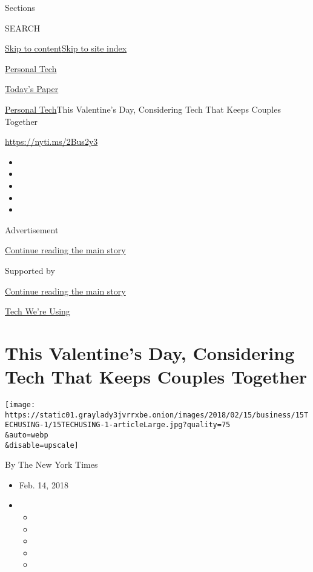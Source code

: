 Sections

SEARCH

\protect\hyperlink{site-content}{Skip to
content}\protect\hyperlink{site-index}{Skip to site index}

\href{https://www.nytimes3xbfgragh.onion/section/technology/personaltech}{Personal
Tech}

\href{https://myaccount.nytimes3xbfgragh.onion/auth/login?response_type=cookie\&client_id=vi}{}

\href{https://www.nytimes3xbfgragh.onion/section/todayspaper}{Today's
Paper}

\href{/section/technology/personaltech}{Personal Tech}\textbar{}This
Valentine's Day, Considering Tech That Keeps Couples Together

\href{https://nyti.ms/2Bus2y3}{https://nyti.ms/2Bus2y3}

\begin{itemize}
\item
\item
\item
\item
\item
\end{itemize}

Advertisement

\protect\hyperlink{after-top}{Continue reading the main story}

Supported by

\protect\hyperlink{after-sponsor}{Continue reading the main story}

\href{/column/tech-we-are-using}{Tech We're Using}

\hypertarget{this-valentines-day-considering-tech-that-keeps-couples-together}{%
\section{This Valentine's Day, Considering Tech That Keeps Couples
Together}\label{this-valentines-day-considering-tech-that-keeps-couples-together}}

\texttt{[image: https://static01.graylady3jvrrxbe.onion/images/2018/02/15/business/15TECHUSING-1/15TECHUSING-1-articleLarge.jpg?quality=75\\\&auto=webp\\\&disable=upscale]}

By The New York Times

\begin{itemize}
\item
  Feb. 14, 2018
\item
  \begin{itemize}
  \item
  \item
  \item
  \item
  \item
  \end{itemize}
\end{itemize}

